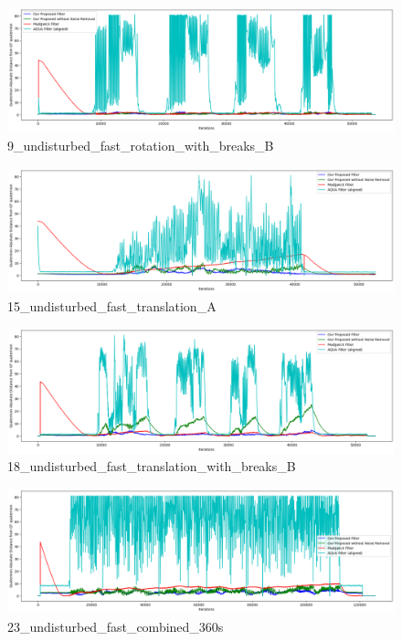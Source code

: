 \documentclass{iutbscthesis}
\begin{document}
\begin{figure}[H]
    \centering
    \includegraphics[width=0.9\linewidth]{figures/9_undisturbed_fast_rotation_with_breaks_B.png}
    \caption{9\_undisturbed\_fast\_rotation\_with\_breaks\_B}
    \label{fig:9_undisturbed_fast_rotation_with_breaks_B}
\end{figure}

\begin{figure}[H]
    \centering
    \includegraphics[width=0.9\linewidth]{figures/15_undisturbed_fast_translation_A.png}
    \caption{15\_undisturbed\_fast\_translation\_A}
    \label{fig:15_undisturbed_fast_translation_A}
\end{figure}

\begin{figure}[H]
    \centering
    \includegraphics[width=0.9\linewidth]{figures/18_undisturbed_fast_translation_with_breaks_B.png}
    \caption{18\_undisturbed\_fast\_translation\_with\_breaks\_B}
    \label{fig:18_undisturbed_fast_translation_with_breaks_B}
\end{figure}

\begin{figure}[H]
    \centering
    \includegraphics[width=0.9\linewidth]{figures/23_undisturbed_fast_combined_360s.png}
    \caption{23\_undisturbed\_fast\_combined\_360s}
    \label{fig:23_undisturbed_fast_combined_360s}
\end{figure}
\end{document}
